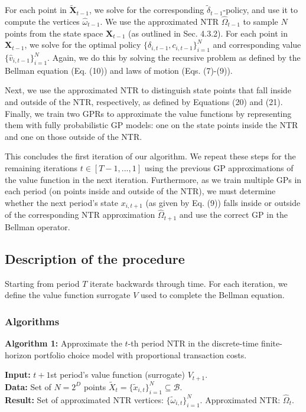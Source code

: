 \documentclass[10pt,a4paper]{article}
\numberwithin{equation}{section} %
\begin{document}
For each point in $\tilde{\mathbf{X}}_{t-1}$, we solve for the corresponding $\tilde{\delta}_{t-1}$-policy, and use it to compute the vertices $\hat{\omega}_{t-1}$. We use the approximated NTR $\hat{\Omega}_{t-1}$ to sample $N$ points from the state space $\mathbf{X}_{t-1}$ (as outlined in Sec. 4.3.2). For each point in $\mathbf{X}_{t-1}$, we solve for the optimal policy $\{ \delta_{i,t-1}, c_{i,t-1} \}_{i=1}^{N}$ and corresponding value $\{ \hat{v}_{i,t-1} \}_{i=1}^{N}$. Again, we do this by solving the recursive problem as defined by the Bellman equation (Eq. (10)) and laws of motion (Eqs. (7)-(9)).

Next, we use the approximated NTR to distinguish state points that fall inside and outside of the NTR, respectively, as defined by Equations (20) and (21). Finally, we train two GPRs to approximate the value functions by representing them with fully probabilistic GP models: one on the state points inside the NTR and one on those outside of the NTR.

This concludes the first iteration of our algorithm. We repeat these steps for the remaining iterations $t \in [T-1, ..., 1]$ using the previous GP approximations of the value function in the next iteration. Furthermore, as we train multiple GPs in each period (on points inside and outside of the NTR), we must determine whether the next period’s state $x_{i,t+1}$ (as given by Eq. (9)) falls inside or outside of the corresponding NTR approximation $\hat{\Omega}_{t+1}$ and use the correct GP in the Bellman operator.


\subsection{Description of the procedure}
Starting from period $T$ iterate backwards through time. For each iteration, we define the value function surrogate $V$
used to complete the Bellman equation. 
\subsubsection{Algorithms}

\textbf{Algorithm 1:} Approximate the $t$-th period NTR in the discrete-time finite-horizon portfolio choice model with proportional transaction costs.

\vspace{0.5cm}

\textbf{Input:} $t + 1$st period's value function (surrogate) $V_{t+1}$. \\
\textbf{Data:} Set of $N = 2^D$ points $\tilde{X}_t = \{\tilde{x}_{i,t}\}_{i=1}^{N} \subseteq \mathcal{B}$. \\
\textbf{Result:} Set of approximated NTR vertices: $\{\tilde{\omega}_{i,t}\}_{i=1}^{N}$. Approximated NTR: $\hat{\Omega}_t$.
\end{document}
